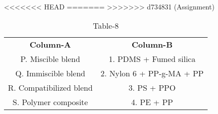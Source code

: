 \begin{table}[htbp]
  \centering
  \caption{Table-8}
<<<<<<< HEAD
  \label{tab:tables/table8.tex}
=======
  \label{table8}
>>>>>>> d734831 (Assignment)
  \begin{tabular}{cc}
\textbf{Column-A} & \textbf{Column-B}\\

P. Miscible blend & 1. PDMS + Fumed silica \\
Q. Immiscible blend & 2. Nylon 6 + PP-g-MA + PP \\
R. Compatibilized blend & 3. PS + PPO \\
S. Polymer composite & 4. PE + PP\\
  
  
  
  \end{tabular}
\end{table}
